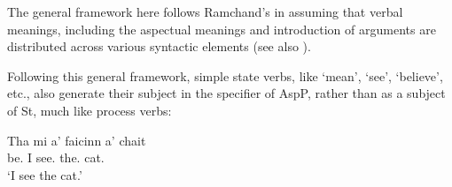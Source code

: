 \documentclass[output=paper]{langsci/langscibook}
\begin{document}
\ea\label{ag-tree}
\z

The general framework here follows Ramchand's in assuming that verbal meanings,
including the aspectual meanings and introduction of arguments are distributed
across various syntactic elements (see also \citealt{Borer2005}).

Following this general framework, simple state verbs, like `mean', `see', `believe', etc., also generate their
subject in the specifier of AspP, rather than as a subject of St, much like
process verbs:\largerpage[2]

\ea {}
\sn \gll Tha mi a' faicinn a' chait\\
be.\Prs{} I \Simp{} see.\Vn{} the.\Gen{} cat.\Gen{}\\
\glt \enquote*{I see the cat.}
\z

\ea\label{ag-tree2}
\z
\end{document}
